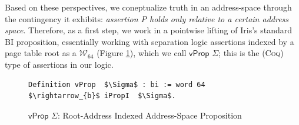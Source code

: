 Based on these perspectives, we coneptualize truth in an address-space through the contingency it exhibits: 
\textit{assertion P holds only relative to a certain address space}. 
Therefore, as a first step, we work in a pointwise lifting of Iris's standard BI proposition,
essentially working with separation logic assertions indexed by a page table root as a $\mathcal{W}_{64}$
(Figure \ref{fig:vprop}), which we call $\textsf{vProp }\Sigma$; this is the (\textsc{Coq}) type of assertions in our logic.
\begin{figure}[t]
\begin{lstlisting}[language=Coq]
  Definition vProp  $\Sigma$ : bi := word 64 $\rightarrow_{b}$ iPropI  $\Sigma$.
  \end{lstlisting}
\caption{$\textsf{vProp }\Sigma$: Root-Address Indexed Address-Space Proposition}
  \label{fig:vprop}
\end{figure}
